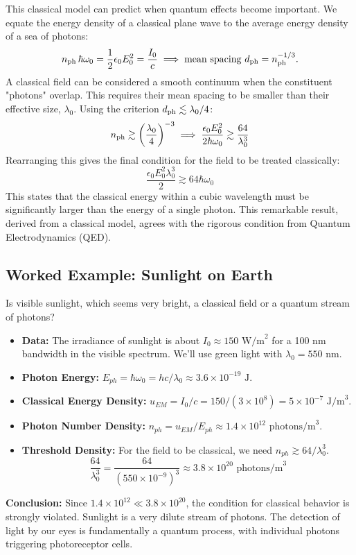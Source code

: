 \documentclass[11pt]{article}
\begin{document}
This classical model can predict when quantum effects become important. We equate the energy density of a classical plane wave to the average energy density of a sea of photons:
\[
n_{\rm ph}\,\hbar\omega_0 = \frac12\epsilon_0E_0^2 = \frac{I_0}{c} \implies \text{mean spacing }d_{\rm ph}=n_{\rm ph}^{-1/3}.
\]
A classical field can be considered a smooth continuum when the constituent "photons" overlap. This requires their mean spacing to be smaller than their effective size, $\lambda_0$. Using the criterion $d_{\rm ph}\lesssim \lambda_0/4$:
\[
n_{\rm ph} \gtrsim \left(\frac{\lambda_0}{4}\right)^{-3} \implies \frac{\epsilon_0E_0^2}{2\hbar\omega_0} \gtrsim \frac{64}{\lambda_0^3}
\]
Rearranging this gives the final condition for the field to be treated classically:
\[
\frac{\epsilon_0E_0^2\lambda_0^3}{2} \gtrsim 64\hbar\omega_0
\]
This states that the classical energy within a cubic wavelength must be significantly larger than the energy of a single photon. This remarkable result, derived from a classical model, agrees with the rigorous condition from Quantum Electrodynamics (QED).

\subsection{Worked Example: Sunlight on Earth}
Is visible sunlight, which seems very bright, a classical field or a quantum stream of photons?
\begin{itemize}
    \item \textbf{Data:} The irradiance of sunlight is about $I_0 \approx 150 \text{ W/m}^2$ for a 100 nm bandwidth in the visible spectrum. We'll use green light with $\lambda_0 = 550 \text{ nm}$.
    \item \textbf{Photon Energy:} $E_{ph} = \hbar\omega_0 = hc/\lambda_0 \approx 3.6 \times 10^{-19} \text{ J}$.
    \item \textbf{Classical Energy Density:} $u_{EM} = I_0/c = 150 / (3 \times 10^8) = 5 \times 10^{-7} \text{ J/m}^3$.
    \item \textbf{Photon Number Density:} $n_{ph} = u_{EM} / E_{ph} \approx 1.4 \times 10^{12} \text{ photons/m}^3$.
    \item \textbf{Threshold Density:} For the field to be classical, we need $n_{ph} \gtrsim 64/\lambda_0^3$.
    \[ \frac{64}{\lambda_0^3} = \frac{64}{(550 \times 10^{-9})^3} \approx 3.8 \times 10^{20} \text{ photons/m}^3 \]
\end{itemize}
\textbf{Conclusion:} Since $1.4 \times 10^{12} \ll 3.8 \times 10^{20}$, the condition for classical behavior is strongly violated. Sunlight is a very dilute stream of photons. The detection of light by our eyes is fundamentally a quantum process, with individual photons triggering photoreceptor cells.
\end{document}
